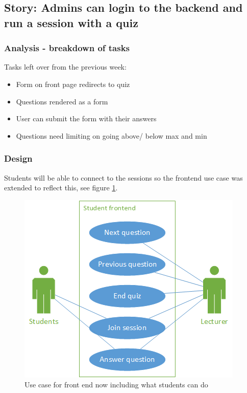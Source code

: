 \subsection{Story: Admins can login to the backend and run a session with a quiz}
\subsubsection{Analysis - breakdown of tasks}
Tasks left over from the previous week:
\begin{itemize}
	\item Form on front page redirects to quiz
	\item Questions rendered as a form
	\item User can submit the form with their answers
	\item Questions need limiting on going above/ below max and min
\end{itemize}
\subsubsection{Design}
Students will be able to connect to the sessions so the frontend use case was extended to reflect this, see figure \ref{fig:iter-5-frontend-use-case}.

\begin{figure}
	\caption{Use case for front end now including what students can do}
	\centerline{\includegraphics{Chapter2/Iter-5/iter-5-frontend-use-case}}
	\label{fig:iter-5-frontend-use-case}
\end{figure}

